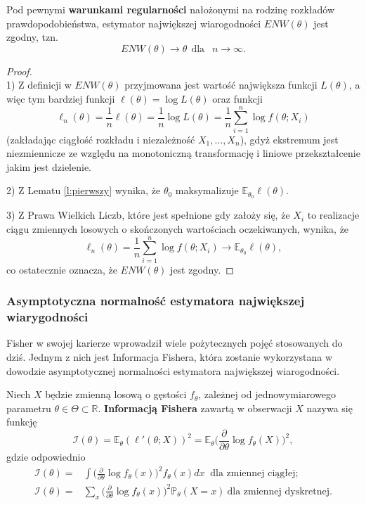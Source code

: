 \begin{theorem}
Pod pewnymi \textbf{warunkami regularności} nałożonymi na rodzinę rozkładów prawdopodobieństwa, estymator największej wiarogodności $ENW(\theta)$ jest zgodny, tzn. 
$$ENW(\theta) \rightarrow \theta \ \ \text{dla } \ \ n \rightarrow \infty.$$
\end{theorem}
\begin{proof}
\ \\
1) Z definicji w $ENW(\theta)$ przyjmowana jest wartość największa funkcji $L(\theta)$, a więc tym bardziej funkcji $ \ell(\theta) = \log L(\theta)$ oraz funkcji $$ \ell_n(\theta) = \frac{1}{n}\ell(\theta) = \frac{1}{n}\log L(\theta) = \frac{1}{n}\sum\limits_{i=1}^{n}\log f(\theta;X_i)$$ (zakładając ciągłość rozkładu i niezależność $X_1,\dots,X_n$), gdyż ekstremum jest niezmiennicze ze względu na monotoniczną transformację i liniowe przekształcenie jakim jest dzielenie.

2) Z Lematu \ref{l:pierwszy} wynika, że $\theta_0$ maksymalizuje $\mathbb{E}_{\theta_0}\ell(\theta)$.

3) Z Prawa Wielkich Liczb, które jest spełnione gdy założy się, że $X_i$ to realizacje ciągu zmiennych losowych o skończonych wartościach oczekiwanych, wynika, że $$ \ell_n(\theta) = \frac{1}{n}\sum\limits_{i=1}^{n}\log f(\theta;X_i) \rightarrow \mathbb{E}_{\theta_0}\ell(\theta),$$ co ostatecznie oznacza, że $ENW(\theta)$ jest zgodny.
\end{proof}

\newpage
\subsubsection{Asymptotyczna normalność estymatora największej wiarygodności}


Fisher w swojej karierze wprowadził wiele pożytecznych pojęć stosowanych do dziś. Jednym z nich jest Informacja Fishera, która zostanie wykorzystana w dowodzie asymptotycznej normalności estymatora największej wiarogodności.

\begin{definition}\label{inf:fish}
Niech $X$ będzie zmienną losową o gęstości $f_{\theta}$, zależnej od jednowymiarowego parametru $\theta \in \Theta \subset \mathbb{R}$. \textbf{Informacją Fishera} zawartą w obserwacji $X$ nazywa się funkcję
\begin{equation}\label{wzor:fish}
\mathcal{I}(\theta) = \mathbb{E}_{\theta}(\ell'(\theta;X))^2 = \mathbb{E}_{\theta}\Big(\frac{\partial}{\partial\theta}\log f_{\theta}(X) \Big)^2,
\end{equation}
gdzie odpowiednio
\begin{align*}
\mathcal{I}(\theta) = & \int \Big(\frac{\partial}{\partial\theta}\log f_{\theta}(x) \Big)^2 f_{\theta}(x)dx \ \text{\ \ \ \ \ dla zmiennej ciągłej;} \\
\mathcal{I}(\theta) = & \sum\limits_{x}^{ } \Big(\frac{\partial}{\partial\theta}\log f_{\theta}(x) \Big)^2 \mathbb{P}_{\theta}(X=x) \ \text{dla zmiennej dyskretnej}.
\end{align*}
\end{definition}

